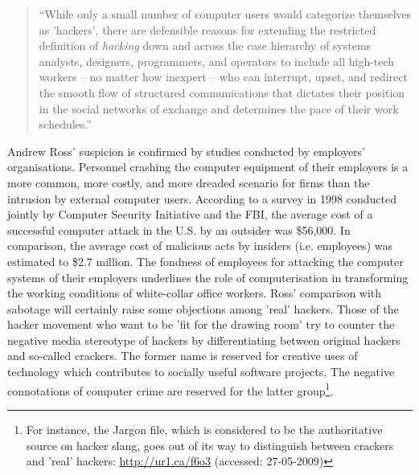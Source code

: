 \begin{quote}
``While only a small number of computer users would categorize themselves as
'hackers', there are defensible reasons for extending the restricted
def\hbox{}inition of \textit{hacking} down and across the case hierarchy of
systems analysts, designers, programmers, and operators to include all high-tech
workers – no matter how inexpert – who can interrupt, upset, and redirect the
smooth f\hbox{}low of structured communications that dictates their position in
the social networks of exchange and determines the pace of their work
schedules.''\cite{gnunited-ross91}
\end{quote}

Andrew Ross' suspicion is conf\hbox{}irmed by studies conducted by employers'
organisations. Personnel crashing the computer equipment of their employers is a
more common, more costly, and more dreaded scenario for f\hbox{}irms than the
intrusion by external computer users. According to a survey in 1998 conducted
jointly by Computer Security Initiative and the FBI, the average cost of a
successful computer attack in the U.S. by an outsider was \$56,000. In
comparison, the average cost of malicious acts by insiders (i.e. employees) was
estimated to \$2.7 million\cite{gnunited-shell_dodge02}. The fondness of
employees for attacking the computer systems of their employers underlines the
role of computerisation in transforming the working conditions of white-collar
of\hbox{}f\hbox{}ice workers. Ross' comparison with sabotage will certainly
raise some objections among 'real' hackers. Those of the hacker movement who
want to be 'f\hbox{}it for the drawing room' try to counter the negative media
stereotype of hackers by dif\hbox{}ferentiating between original hackers and
so-called crackers. The former name is reserved for creative uses of technology
which contributes to socially useful software projects. The negative
connotations of computer crime are reserved for the latter group\footnote{For
instance, the Jargon f\hbox{}ile, which is considered to be the authoritative
source on hacker slang, goes out of its way to distinguish between crackers and
'real' hackers: \url{http://ur1.ca/f6o3} (accessed: 27-05-2009)}.

